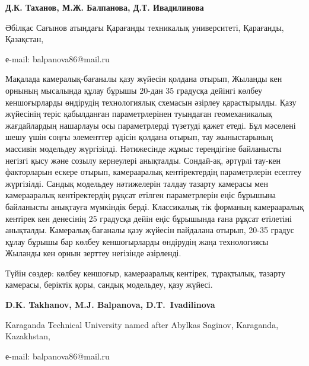 \begin{center}
{\bfseries Д.К. Таханов, М.Ж. Балпанова\envelope, Д.Т. Ивадилинова}

Әбілқас Сағынов атындағы Қарағанды техникалық
университеті, Қарағанды, Қазақстан,

е-mail: balpanova86@mail.ru
\end{center}

Мақалада камералық-бағаналы қазу жүйесін қолдана отырып, Жыланды кен
орнының мысалында құлау бұрышы 20-дан 35 градусқа дейінгі көлбеу
кеншоғырларды өндірудің технологиялық схемасын әзірлеу қарастырылды.
Қазу жүйесінің теріс қабылданған параметрлерінен туындаған
геомеханикалық жағдайлардың нашарлауы осы параметрлерді түзетуді қажет
етеді. Бұл мәселені шешу үшін соңғы элементтер әдісін қолдана отырып,
тау жыныстарының массивін модельдеу жүргізілді. Нәтижесінде жұмыс
тереңдігіне байланысты негізгі қысу және созылу кернеулері анықталды.
Сондай-ақ, әртүрлі тау-кен факторларын ескере отырып, камерааралық
кентіректердің параметрлерін есептеу жүргізілді. Сандық модельдеу
нәтижелерін талдау тазарту камерасы мен камерааралық кентіректердің
рұқсат етілген параметрлерін еңіс бұрышына байланысты анықтауға
мүмкіндік берді. Классикалық тік форманың камерааралық кентірек кен
денесінің 25 градусқа дейін еңіс бұрышында ғана рұқсат етілетіні
анықталды. Камералық-бағаналы қазу жүйесін пайдалана отырып, 20-35
градус құлау бұрышы бар көлбеу кеншоғырларды өндірудің жаңа технологиясы
Жыланды кен орнын зерттеу негізінде әзірленді.

Түйін сөздер: көлбеу кеншоғыр, камерааралық кентірек, тұрақтылық,
тазарту камерасы, беріктік қоры, сандық модельдеу, қазу жүйесі.


\begin{center}
{\bfseries D.K. Takhanov, M.J.
Balpanova\envelope, D.T.~Ivadilinova}

Karaganda Technical University named after Abylkas
Saginov, Karaganda, Kazakhstan,

е-mail: balpanova86@mail.ru
\end{center}

